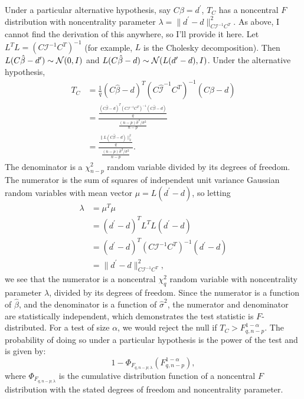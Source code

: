 \documentclass[12pt]{article}
\begin{document}
Under a particular alternative hypothesis, say $C \beta = d^\prime$, $T_C$ has a noncentral $F$ distribution with noncentrality parameter $\lambda = \| d^\prime - d \|_{C \mathcal{I}^{-1} C^T}^2$. As above, I cannot find the derivation of this anywhere, so I'll provide it here. Let $L^T L = (C \mathcal{I}^{-1} C^T)^{-1}$ (for example, $L$ is the Cholesky decomposition). Then $L (C \hat{\beta} - d^\prime) \sim {\mathcal N}(0, I)$ and $L(C \hat{\beta} - d) \sim {\mathcal N}(L (d^\prime - d), I)$. Under the alternative hypothesis,
\begin{align*}
   T_C &= \frac{1}{q} (C \hat{\beta} - d)^T (C \hat{\mathcal{I}}^{-1} C^T)^{-1} (C \hat{\beta} - d) \\
      &= \frac{\frac{(C \hat{\beta} - d)^T (C \mathcal{I}^{-1} C^T)^{-1} (C \hat{\beta} - d)}{q}}{\frac{(n-p) \hat{\sigma}^2 / \sigma^2}{n-p}} \\
      &= \frac{\frac{\| L (C \hat{\beta} - d) \|_2^2}{q}}{\frac{(n-p) \hat{\sigma}^2 / \sigma^2}{n-p}}.
\end{align*}
The denominator is a $\chi_{n-p}^2$ random variable divided by its degrees of freedom. The numerator is the sum of squares of independent unit variance Gaussian random variables with mean vector $\mu = L (d^\prime - d)$, so letting 
\begin{align*}
   \lambda &= \mu^T \mu \\
      &= (d^\prime - d)^T L^T L (d^\prime - d) \\
      &= (d^\prime - d)^T (C \mathcal{I}^{-1} C^T)^{-1} (d^\prime - d) \\
      &= \| d^\prime - d \|_{C \mathcal{I}^{-1} C^T}^2,
\end{align*}
we see that the numerator is a noncentral $\chi_q^2$ random variable with noncentrality parameter $\lambda$, divided by its degrees of freedom. Since the numerator is a function of $\hat{\beta}$, and the denominator is a function of $\hat{\sigma}^2$, the numerator and denominator are statistically independent, which demonstrates the test statistic is $F$-distributed. For a test of size $\alpha$, we would reject the null if $T_C > F_{q, n-p}^{1 - \alpha}$. The probability of doing so under a particular hypothesis is the power of the test and is given by:
\begin{displaymath}
   1 - \Phi_{F_{q, n-p; \lambda}}(F_{q, n-p}^{1 - \alpha}),
\end{displaymath}
where $\Phi_{F_{q, n-p; \lambda}}$ is the cumulative distribution function of a noncentral $F$ distribution with the stated degrees of freedom and noncentrality parameter.
\end{document}
